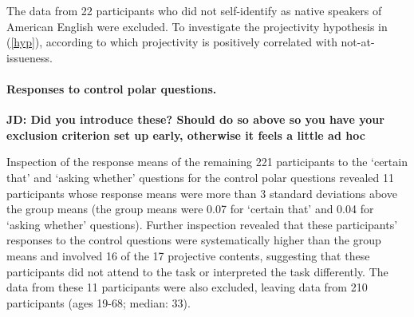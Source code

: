 \documentclass[11pt,fleqn]{article}
\newcommand{\6}{\mbox{$[\hspace*{-.6mm}[$}}
\newcommand{\9}{\mbox{$]\hspace*{-.6mm}]$}}
\begin{document}
The data from 22 participants who did not self-identify as native speakers of American English were excluded. To investigate the projectivity hypothesis in (\ref{hyp}), according to which projectivity is positively correlated with not-at-issueness.

\paragraph{Responses to control polar questions.} 

{\bf JD: Did you introduce these? Should do so above so you have your exclusion criterion set up early, otherwise it feels a little ad hoc}

Inspection of the response means of the remaining 221 participants to the `certain that' and `asking whether' questions for the control polar questions revealed 11 participants whose response means were more than 3 standard deviations above the group means (the group means were 0.07 for `certain that' and 0.04 for `asking whether' questions). Further inspection revealed that these participants' responses to the control questions were systematically higher than the group means and involved 16 of the 17 projective contents, suggesting that these participants did not attend to the task or interpreted the task differently. The data from these 11 participants were also excluded, leaving data from 210 participants (ages 19-68; median: 33).  
\end{document}
